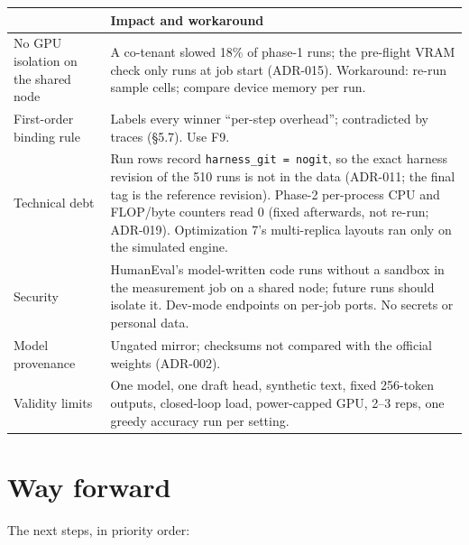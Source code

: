 \documentclass[10pt,a4paper]{article}
\newcommand{\hc}[1]{{\leavevmode\bfseries\color{ink}#1}}   %
\begin{document}
\begin{table}[H]
\small
\begin{tabularx}{\linewidth}{@{}P{3.7cm}L@{}}
\toprule
\rowcolor{tblhead}\hc{Known defect / risk} & \hc{Impact and workaround} \\
\midrule
No GPU isolation on the shared node & A co-tenant slowed 18\% of phase-1 runs; the pre-flight VRAM check only runs at
job start (ADR-015). Workaround: re-run sample cells; compare device memory per run. \\
 First-order binding rule & Labels every winner ``per-step overhead''; contradicted by traces (\S5.7). Use F9.\\
Technical debt & Run rows record \texttt{harness\_git = nogit}, so the exact harness revision of the 510 runs is not in
the data (ADR-011; the final tag is the reference revision). Phase-2 per-process CPU and FLOP/byte counters read 0
(fixed afterwards, not re-run; ADR-019). Optimization 7's multi-replica layouts ran only on the simulated engine. \\
 Security & HumanEval's model-written code runs without a sandbox
in the measurement job on a shared node; future runs should isolate it. Dev-mode endpoints on per-job ports. No secrets or personal data.\\
Model provenance & Ungated mirror; checksums not compared with the official weights (ADR-002). \\
 Validity limits & One model, one draft head, synthetic text, fixed 256-token outputs, closed-loop load, power-capped
GPU, 2--3 reps, one greedy accuracy run per setting. \\
\bottomrule
\end{tabularx}
\end{table}

\section{Way forward}
The next steps, in priority order:
\end{document}
